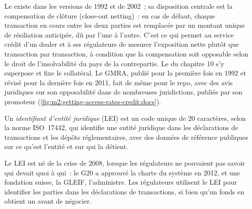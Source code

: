 Le  existe dans les versions de 1992 et de 2002~; sa disposition centrale est
la compensation de clôture (close-out netting)~: en cas de défaut, chaque transaction en cours entre
les deux parties est remplacée par un montant unique de résiliation anticipée, dû par l'une à l'autre. C'est ce qui permet
au service crédit d'un dealer et à ses régulateurs de mesurer l'exposition nette plutôt que transaction par
transaction, à condition que la compensation soit opposable selon le droit de l'insolvabilité du pays de la
contrepartie. Le  du chapitre 10 s'y superpose et
fixe le collatéral. Le GMRA, publié pour la première fois en 1992 et révisé pour la dernière fois en 2011, fait
de même pour le repo, avec des avis juridiques sur son opposabilité dans de nombreuses juridictions,
publiés par son promoteur (\cref{fig:m2:getting-access-rates-credit:docs}).

\begin{definition}\label{def:m2:getting-access-rates-credit:lei}
Un \emph{identifiant d'entité juridique} (LEI) est un code unique
de 20 caractères, selon la norme ISO~17442, qui identifie une entité juridique dans
les déclarations de transactions et les dépôts réglementaires, avec des données de référence publiques sur ce qu'est l'entité
et sur qui la détient.
\end{definition}

Le LEI est né de la crise de 2008, lorsque les régulateurs ne pouvaient pas savoir qui devait quoi à
qui~: le G20 a approuvé la charte du système en 2012, et une fondation suisse, la GLEIF,
l'administre. Les régulateurs utilisent le LEI pour identifier les parties dans les déclarations de transactions, si bien qu'un
fonds en obtient un avant de négocier.

